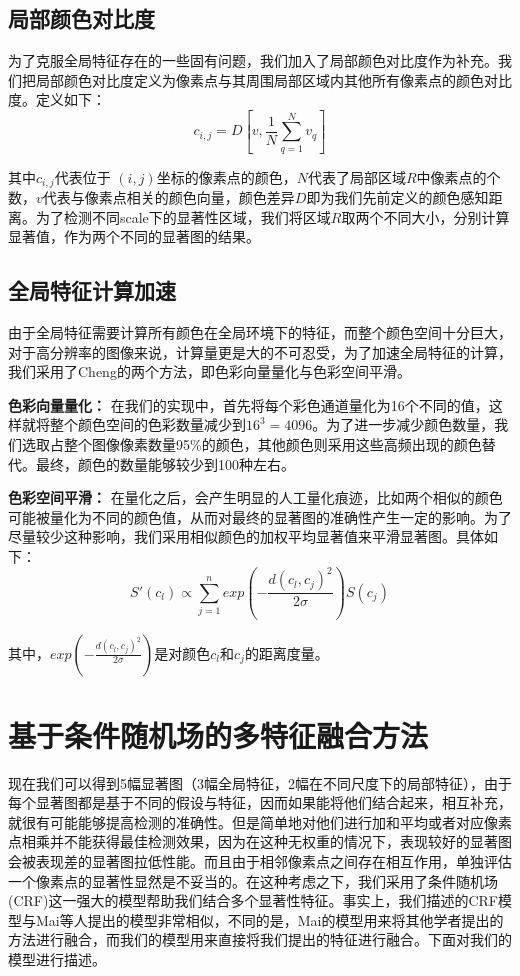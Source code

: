\subsection{局部颜色对比度}
为了克服全局特征存在的一些固有问题，我们加入了局部颜色对比度作为补充。我们把局部颜色对比度定义为像素点与其周围局部区域内其他所有像素点的颜色对比度。定义如下：
\begin{equation}
  c_{i,j} = D\left [v, \frac{1}{N} \sum_{q=1}^{N}v_q \right ]
\end{equation}

其中$c_{i,j}$代表位于 $(i,j)$坐标的像素点的颜色，$N$代表了局部区域$R$中像素点的个数，$v$代表与像素点相关的颜色向量，颜色差异$D$即为我们先前定义的颜色感知距离。为了检测不同scale下的显著性区域，我们将区域$R$取两个不同大小，分别计算显著值，作为两个不同的显著图的结果。

\subsection{全局特征计算加速}
由于全局特征需要计算所有颜色在全局环境下的特征，而整个颜色空间十分巨大，对于高分辨率的图像来说，计算量更是大的不可忍受，为了加速全局特征的计算，我们采用了Cheng\cite{cheng2011global}的两个方法，即色彩向量量化与色彩空间平滑。

\textbf{色彩向量量化：} 在我们的实现中，首先将每个彩色通道量化为16个不同的值，这样就将整个颜色空间的色彩数量减少到$16^3 = 4096$。为了进一步减少颜色数量，我们选取占整个图像像素数量95\%的颜色，其他颜色则采用这些高频出现的颜色替代。最终，颜色的数量能够较少到100种左右。

\textbf{色彩空间平滑：} 在量化之后，会产生明显的人工量化痕迹，比如两个相似的颜色可能被量化为不同的颜色值，从而对最终的显著图的准确性产生一定的影响。为了尽量较少这种影响，我们采用相似颜色的加权平均显著值来平滑显著图。具体如下：
\begin{equation}
  S'(c_l) \propto \sum_{j=1}^{n} exp(-\frac{d(c_l, c_j)^2}{2\sigma})S(c_j)
\end{equation}

其中，$exp(-\frac{d(c_l, c_j)^2}{2\sigma})$是对颜色$c_l$和$c_j$的距离度量。

\section{基于条件随机场的多特征融合方法}
现在我们可以得到5幅显著图（3幅全局特征，2幅在不同尺度下的局部特征），由于每个显著图都是基于不同的假设与特征，因而如果能将他们结合起来，相互补充，就很有可能能够提高检测的准确性\cite{borji2012salient}。但是简单地对他们进行加和平均或者对应像素点相乘并不能获得最佳检测效果，因为在这种无权重的情况下，表现较好的显著图会被表现差的显著图拉低性能\cite{gopalakrishnan2009salient}。而且由于相邻像素点之间存在相互作用，单独评估一个像素点的显著性显然是不妥当的。在这种考虑之下，我们采用了条件随机场(CRF)这一强大的模型帮助我们结合多个显著性特征。事实上，我们描述的CRF模型与Mai等人提出的模型\cite{maisaliency}非常相似，不同的是，Mai的模型用来将其他学者提出的方法进行融合，而我们的模型用来直接将我们提出的特征进行融合。下面对我们的模型进行描述。

